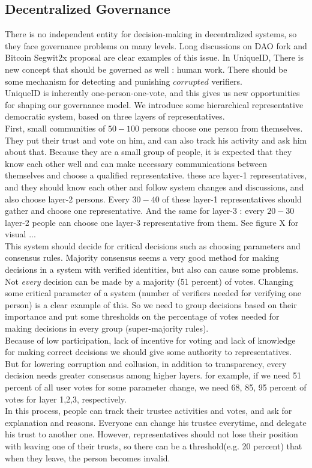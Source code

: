 \documentclass[conference]{IEEEtran}
\begin{document}
\subsection{Decentralized Governance}
There is no independent entity for decision-making in decentralized systems, so they face governance problems on many levels. Long discussions on  DAO fork and Bitcoin Segwit2x proposal are clear examples of this issue. In UniqueID, There is new concept that should be governed as well : human work. There should be some mechanism for detecting and punishing $corrupted$ verifiers.
\\
UniqueID is inherently one-person-one-vote, and this gives us new opportunities for shaping our governance model. We introduce some hierarchical representative democratic system, based on three layers of representatives. 
\\
First, small communities of $50-100$ persons choose one person from themselves. They put their trust and vote on him, and can also track his activity and ask him about that. Because they are a small group of people, it is expected that they know each other well and can make necessary communications between themselves and choose a qualified representative. these are layer-1 representatives, and they should know each other and follow system changes and discussions, and also choose layer-2 persons. Every $30-40$ of these layer-1 representatives should gather and choose one representative. And the same for layer-3 : every $20-30$ layer-2 people can choose one layer-3 representative from them. See figure X for visual ...
\\
This system should decide for critical decisions such as choosing parameters and consensus rules. Majority consensus seems a very good method for making decisions in a system with verified identities, but also can cause some problems. Not \textit{every} decision can be made by a majority (51 percent) of votes. Changing some critical parameter of a system (number of verifiers needed for verifying one person) is a clear example of this. So we need to group decisions based on their importance and put some thresholds on the percentage of votes needed for making decisions in every group (super-majority rules).
\\
Because of low participation, lack of incentive for voting and lack of knowledge for making correct decisions we should give some authority to representatives. But for lowering corruption and collusion, in addition to transparency, every decision needs greater consensus among higher layers. for example, if we need 51 percent of all user votes for some parameter change, we need 68, 85, 95 percent  of votes for layer 1,2,3, respectively.
\\
In this process, people can track their trustee activities and votes, and ask for explanation and reasons. Everyone can change his trustee everytime, and delegate his trust to another one. However, representatives should not lose their position with leaving one of their trusts, so there can be a threshold(e.g. 20 percent) that when they leave, the person becomes invalid. \\
\end{document}
